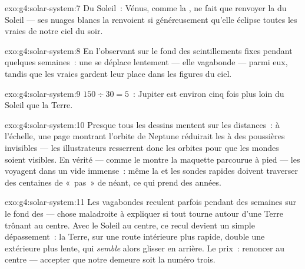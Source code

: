 \begin{solution}{exo:g4:solar-system:7}
Du Soleil~: Vénus, comme la , ne fait que renvoyer la  du
Soleil --- ses nuages blancs la renvoient si généreusement qu'elle
éclipse toutes les vraies  de notre ciel du soir.
\end{solution}

\begin{solution}{exo:g4:solar-system:8}
En l'observant sur le fond des scintillements fixes pendant quelques
semaines~: une  se déplace lentement --- elle vagabonde ---
parmi eux, tandis que les vraies  gardent leur place dans les
figures du ciel.
\end{solution}

\begin{solution}{exo:g4:solar-system:9}
$150 \div 30 = 5$~: Jupiter est environ cinq fois plus loin du Soleil
que la Terre.
\end{solution}

\begin{solution}{exo:g4:solar-system:10}
Presque tous les dessins mentent sur les distances~: à l'échelle, une
page montrant l'orbite de Neptune réduirait les  à des
poussières invisibles --- les illustrateurs resserrent donc les
orbites pour que les mondes soient visibles. En vérité --- comme le
montre la maquette parcourue à pied --- les  voyagent dans un
vide immense~: même la  et les sondes rapides doivent
traverser des centaines de «~pas~» de néant, ce qui prend des
années.
\end{solution}

\begin{solution}{exo:g4:solar-system:11}
Les vagabondes reculent parfois pendant des semaines sur le fond des
 --- chose maladroite à expliquer si tout tourne autour d'une
Terre trônant au centre. Avec le Soleil au centre, ce recul devient
un simple dépassement~: la Terre, sur une route intérieure plus
rapide, double une  extérieure plus lente, qui \emph{semble}
alors glisser en arrière. Le prix~: renoncer au centre --- accepter
que notre demeure soit la  numéro trois.
\end{solution}
